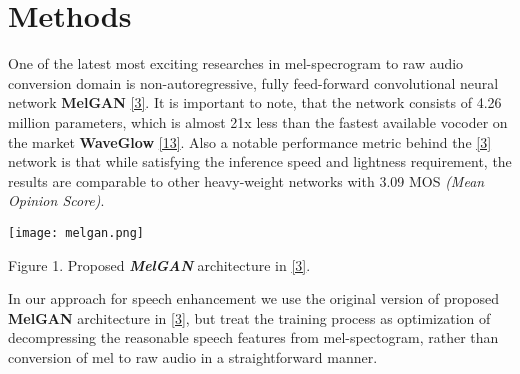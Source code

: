 \documentclass{article}
\begin{document}
\section{Methods}

\begin{flushleft}



One of the latest most exciting researches in mel-specrogram to raw audio conversion domain is non-autoregressive, fully feed-forward convolutional neural network \textbf{MelGAN} \hyperlink{refer}{[3]}. It is important to note, that the network consists of 4.26 million parameters, which is almost 21x less than the fastest available vocoder on the market \textbf{WaveGlow} \hyperlink{refer}{[13]}. Also a notable performance metric behind the \hyperlink{refer}{[3]} network is that while satisfying the inference speed and lightness requirement, the results are comparable to other heavy-weight networks with 3.09 MOS \textit{(Mean Opinion Score)}.


\end{flushleft}

\texttt{[image: melgan.png]}
\centering
\begin{center}
Figure 1. Proposed \textit{\textbf{MelGAN}} architecture in \hyperlink{refer}{[3]}. 
\end{center}

\begin{flushleft}

In our approach for speech enhancement we use the original version of proposed \textbf{MelGAN} architecture in \hyperlink{refer}{[3]}, but treat the training process as optimization of decompressing the reasonable speech features from mel-spectogram, rather than conversion of mel to raw audio in a straightforward manner.

\end{flushleft}
\end{document}
